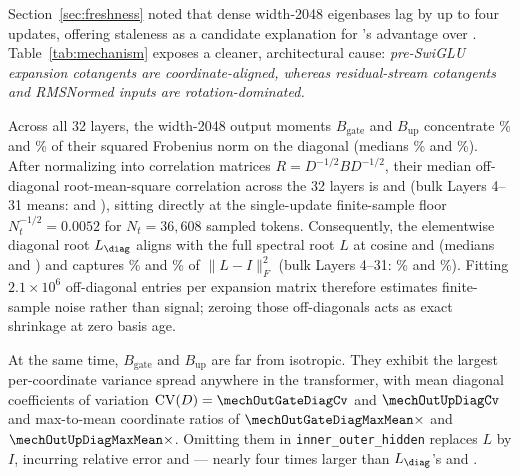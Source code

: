 Section~\ref{sec:freshness} noted that dense width-2048 eigenbases lag by up to
four updates, offering staleness as a candidate explanation for \mlpdiag{}'s
advantage over \dense{}. Table~\ref{tab:mechanism} exposes a cleaner,
architectural cause: \emph{pre-SwiGLU expansion cotangents are coordinate-aligned,
whereas residual-stream cotangents and RMSNormed inputs are rotation-dominated.}

Across all 32 layers, the width-2048 output moments $B_{\text{gate}}$ and
$B_{\text{up}}$ concentrate \mechOutGateDiagEnergyPct\% and
\mechOutUpDiagEnergyPct\% of their squared Frobenius norm on the diagonal
(medians \mechOutGateDiagEnergyMedPct\% and \mechOutUpDiagEnergyMedPct\%).
After normalizing into correlation matrices $R = D^{-1/2}BD^{-1/2}$, their
median off-diagonal root-mean-square correlation across the 32 layers is
\mechOutGateCorrRmsMed{} and \mechOutUpCorrRmsMed{} (bulk Layers 4--31 means:
\mechOutGateBulkCorrRms{} and \mechOutUpBulkCorrRms{}), sitting directly at the
single-update finite-sample floor $N_t^{-1/2} = 0.0052$ for $N_t = 36{,}608$
sampled tokens. Consequently, the elementwise diagonal root $L_{\diag}$ aligns
with the full spectral root $L$ at cosine \mechOutGateCosL{} and
\mechOutUpCosL{} (medians \mechOutGateCosLMed{} and \mechOutUpCosLMed{}) and
captures \mechOutGateExpVarLPct\% and \mechOutUpExpVarLPct\% of $\|L - I\|_F^2$
(bulk Layers 4--31: \mechOutGateBulkExpVarLPct\% and
\mechOutUpBulkExpVarLPct\%). Fitting $2.1\times 10^6$ off-diagonal entries per
expansion matrix therefore estimates finite-sample noise rather than signal;
zeroing those off-diagonals acts as exact shrinkage at zero basis age.

At the same time, $B_{\text{gate}}$ and $B_{\text{up}}$ are far from isotropic.
They exhibit the largest per-coordinate variance spread anywhere in the
transformer, with mean diagonal coefficients of variation
$\mathrm{CV}(D) = \mechOutGateDiagCv$ and $\mechOutUpDiagCv$ and max-to-mean
coordinate ratios of $\mechOutGateDiagMaxMean\times$ and
$\mechOutUpDiagMaxMean\times$. Omitting them in \texttt{inner\_outer\_hidden}
replaces $L$ by $I$, incurring relative error \mechOutGateDropErrL{} and
\mechOutUpDropErrL{} --- nearly four times larger than $L_{\diag}$'s
\mechOutGateRelErrL{} and \mechOutUpRelErrL{}.

